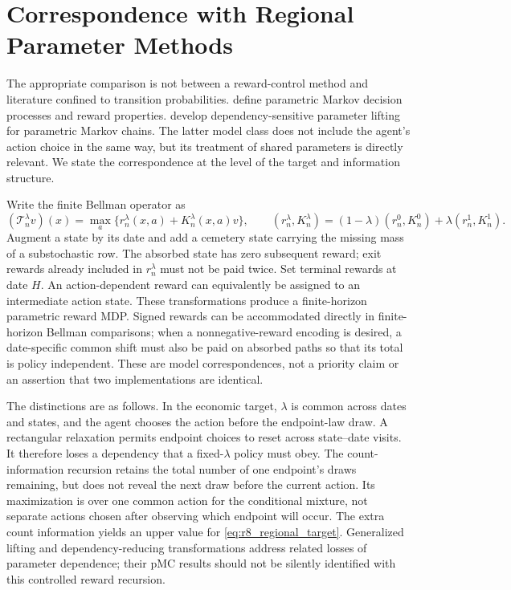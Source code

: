 \section{Correspondence with Regional Parameter Methods}
\label{sec:r8_correspondence}
The appropriate comparison is not between a reward-control method and literature confined to transition probabilities. \citet{quatmann2016} define parametric Markov decision processes and reward properties. \citet{heck2025} develop dependency-sensitive parameter lifting for parametric Markov chains. The latter model class does not include the agent's action choice in the same way, but its treatment of shared parameters is directly relevant. We state the correspondence at the level of the target and information structure.

Write the finite Bellman operator as
\begin{equation}
 (\mathcal T_n^\lambda v)(x)=\max_a\{r_n^\lambda(x,a)
                                    +K_n^\lambda(x,a)v\},\qquad
 (r_n^\lambda,K_n^\lambda)=(1-\lambda)(r_n^0,K_n^0)+\lambda(r_n^1,K_n^1).
 \label{eq:r8_regional_target}
\end{equation}
Augment a state by its date and add a cemetery state carrying the missing mass of a substochastic row. The absorbed state has zero subsequent reward; exit rewards already included in $r_n^\lambda$ must not be paid twice. Set terminal rewards at date $H$. An action-dependent reward can equivalently be assigned to an intermediate action state. These transformations produce a finite-horizon parametric reward MDP. Signed rewards can be accommodated directly in finite-horizon Bellman comparisons; when a nonnegative-reward encoding is desired, a date-specific common shift must also be paid on absorbed paths so that its total is policy independent. These are model correspondences, not a priority claim or an assertion that two implementations are identical.

The distinctions are as follows. In the economic target, $\lambda$ is common across dates and states, and the agent chooses the action before the endpoint-law draw. A rectangular relaxation permits endpoint choices to reset across state--date visits. It therefore loses a dependency that a fixed-$\lambda$ policy must obey. The count-information recursion retains the total number of one endpoint's draws remaining, but does not reveal the next draw before the current action. Its maximization is over one common action for the conditional mixture, not separate actions chosen after observing which endpoint will occur. The extra count information yields an upper value for \eqref{eq:r8_regional_target}. Generalized lifting and dependency-reducing transformations address related losses of parameter dependence; their pMC results should not be silently identified with this controlled reward recursion.

